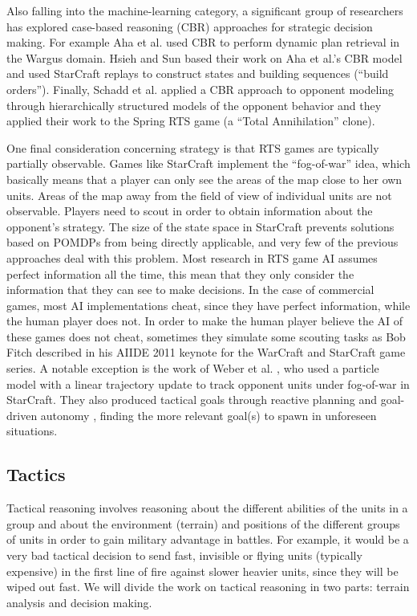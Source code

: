 \documentclass[journal]{IEEEtran}
\begin{document}
Also falling into the machine-learning category, a significant group of researchers has explored case-based reasoning (CBR) \cite{Aamodt94CBR} approaches for strategic decision making. For example Aha et al. \cite{LTW} used CBR to perform dynamic plan retrieval in the Wargus domain. Hsieh and Sun \cite{HsiehS08} based their work on Aha et al.'s CBR model \cite{LTW} and used StarCraft replays to construct states and building sequences (``build orders''). Finally, Schadd et al. \cite{SchaddBS07} applied a CBR approach to opponent modeling through hierarchically structured models of the opponent behavior and they applied their work to the Spring RTS game (a ``Total Annihilation'' clone).

One final consideration concerning strategy is that RTS games are typically partially observable. Games like StarCraft implement the ``fog-of-war'' idea, which basically means that a player can only see the areas of the map close to her own units. Areas of the map away from the field of view of individual units are not observable. Players need to scout in order to obtain information about the opponent's strategy. The size of the state space in StarCraft prevents solutions based on POMDPs from being directly applicable, and very few of the previous approaches deal with this problem. Most research in RTS game AI assumes perfect information all the time, this mean that they only consider the information that they can see to make decisions. In the case of commercial games, most AI implementations cheat, since they have perfect information, while the human player does not. In order to make the human player believe the AI of these games does not cheat, sometimes they simulate some scouting tasks as Bob Fitch described in his AIIDE 2011 keynote for the WarCraft and StarCraft game series. A notable exception is the work of Weber et al. \cite{WeberAIIDE11}, who used a particle model with a linear trajectory update to track opponent units under fog-of-war in StarCraft. They also produced tactical goals through reactive planning and goal-driven autonomy \cite{WeberCig10,Weber10}, finding the more relevant goal(s) to spawn in unforeseen situations. 


\subsection{Tactics}

Tactical reasoning involves reasoning about the different abilities of the units in a group and about the environment (terrain) and positions of the different groups of units in order to gain military advantage in battles. For example, it would be a very bad tactical decision to send fast, invisible or flying units (typically expensive) in the first line of fire against slower heavier units, since they will be wiped out fast. We will divide the work on tactical reasoning in two parts: terrain analysis and decision making.
\end{document}
